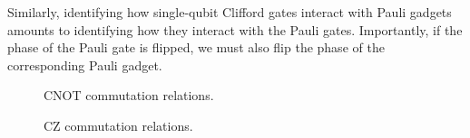 
Similarly, identifying how single-qubit Clifford gates interact with Pauli gadgets amounts to identifying how they interact with the Pauli gates. Importantly, if the phase of the Pauli gate is flipped, we must also flip the phase of the corresponding Pauli gadget.


\begin{figure}[H]
    \centering
    \caption{CNOT commutation relations.}
    \label{cnot-commutations}
\end{figure}

\begin{figure}[H]
    \centering
    \caption{CZ commutation relations.}
    \label{cz-commutations}
\end{figure}







